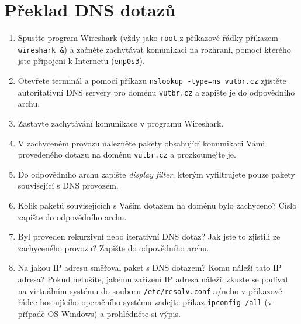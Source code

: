 \section{Překlad DNS dotazů}
\begin{enumerate}
    \item Spusťte program Wireshark (vždy jako \texttt{root} z příkazové řádky příkazem \texttt{wireshark \&}) a začněte zachytávat komunikaci na rozhraní, pomocí kterého jste připojeni k Internetu (\texttt{enp0s3}).
    \item Otevřete terminál a pomocí příkazu \texttt{nslookup -type=ns vutbr.cz} zjistěte autoritativní DNS servery pro doménu \texttt{vutbr.cz} a zapište je do odpovědního archu.
    \item Zastavte zachytávání komunikace v programu Wireshark.
    \item V zachyceném provozu nalezněte pakety obsahující komunikaci Vámi provedeného dotazu na doménu \texttt{vutbr.cz} a prozkoumejte je.
	\item Do odpovědního archu zapište \emph{display filter}, kterým vyfiltrujete pouze pakety související s DNS provozem.
	\item Kolik paketů souvisejících s Vaším dotazem na doménu bylo zachyceno? Číslo zapište do odpovědního archu.
	\item Byl proveden rekurzivní nebo iterativní DNS dotaz? Jak jste to zjistili ze zachyceného provozu? Zapište do odpovědního archu.
	\item Na jakou IP adresu směřoval paket s DNS dotazem? Komu náleží tato IP adresa? Pokud netušíte, jakému zařízení IP adresa náleží, zkuste se podívat na virtuálním systému do souboru \texttt{/etc/resolv.conf} a/nebo v příkazové řádce hostujícího operačního systému zadejte příkaz \texttt{ipconfig /all} (v případě OS Windows) a prohlédněte si výpis.
\end{enumerate}


